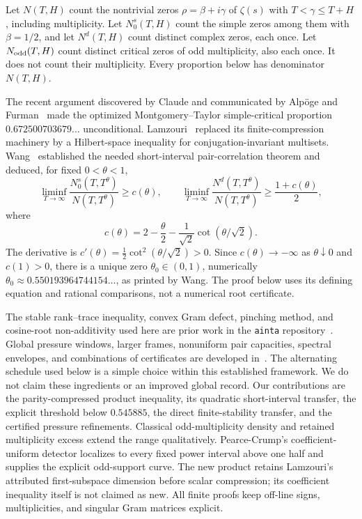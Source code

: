 \documentclass[11pt]{article}
\theoremstyle{remark}
\begin{document}
Let $N(T,H)$ count the nontrivial zeros $\rho=\beta+i\gamma$ of $\zeta(s)$
with $T<\gamma\le T+H$, including multiplicity. Let $N_0^s(T,H)$ count the
simple zeros among them with $\beta=1/2$, and let $N^d(T,H)$ count distinct
complex zeros, each once. Let $N_{\rm odd}(T,H)$ count distinct critical
zeros of odd multiplicity, also each once. It does not count their
multiplicity. Every proportion below has denominator $N(T,H)$.

The recent argument discovered by Claude and communicated by Alp\"oge and %
Furman~\cite{AF} made the optimized Montgomery--Taylor simple-critical
proportion $0.672500703679\ldots$ unconditional. Lamzouri~\cite{Lamzouri}
replaced its finite-compression machinery by a Hilbert-space inequality for
conjugation-invariant multisets. Wang~\cite{Wang} established the needed
short-interval pair-correlation theorem and deduced, for fixed $0<\theta<1$,
\begin{equation}\label{eq:wang}
 \liminf_{T\to\infty}\frac{N_0^s(T,T^\theta)}{N(T,T^\theta)}\ge c(\theta),
 \qquad
 \liminf_{T\to\infty}\frac{N^d(T,T^\theta)}{N(T,T^\theta)}
 \ge\frac{1+c(\theta)}2,
\end{equation}
where
\begin{equation}\label{eq:c}
 c(\theta)=2-\frac\theta2-\frac1{\sqrt2}\cot(\theta/\sqrt2).
\end{equation}
The derivative is $c'(\theta)=\tfrac12\cot^2(\theta/\sqrt2)>0$. Since
$c(\theta)\to-\infty$ as $\theta\downarrow0$ and $c(1)>0$, there is a
unique zero $\theta_0\in(0,1)$, numerically
$\theta_0\approx0.550193964744154\ldots$, as printed by Wang. The
proof below uses its defining equation and rational comparisons, not a
numerical root certificate.

The stable rank--trace inequality, convex Gram defect, pinching method, and
cosine-root non-additivity used here are prior work in the
\texttt{ainta} repository~\cite{Ainta}. Global pressure windows, larger
frames, nonuniform pair capacities, spectral envelopes, and combinations
of certificates are developed in~\cite{Trmdy,Tawan,Shi}. The alternating
schedule used below is a simple choice within this established framework.
We do not claim these ingredients or an improved global record. Our
contributions are the parity-compressed product inequality, its quadratic
short-interval transfer, the explicit threshold below $0.545885$, the direct
finite-stability transfer, and the certified pressure refinements. Classical
odd-multiplicity density and retained multiplicity excess extend the range
qualitatively. Pearce-Crump's coefficient-uniform detector localizes to every
fixed power interval above one half and supplies the explicit odd-support
curve. The new product retains Lamzouri's attributed first-subspace dimension
before scalar compression; its coefficient inequality itself is not claimed
as new. All finite proofs keep off-line signs, multiplicities, and singular
Gram matrices explicit.
\end{document}
